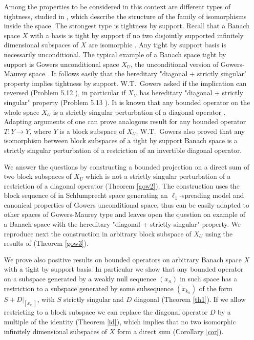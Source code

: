 \documentclass{amsart}
\numberwithin{subsection}{section}
\numberwithin{equation}{section}
\begin{document}
Among the properties to be considered in this context are different types of tightness, studied in \cite{FR1,FR2}, which describe the structure of the family of isomorphisms inside the space. The strongest type is tightness by support. Recall that a  Banach space $X$ with a basis is tight by support if no two disjointly supported infinitely dimensional subspaces of $X$ are isomorphic \cite{FR1}. Any tight by support basis is necessarily unconditional. The typical example of a Banach space tight by support is Gowers unconditional space $X_U$, the unconditional version of Gowers-Maurey space \cite{FR2,G2}. It follows easily that the hereditary "diagonal + strictly singular" property implies tightness by support. W.T.~Gowers asked if the implication can reversed (Problem 5.12 \cite{G2}), in particular if $X_U$ has hereditary "diagonal + strictly singular" property  (Problem 5.13 \cite{G2}). It is known that any bounded operator on the whole space $X_U$ is a strictly singular perturbation of a diagonal operator \cite{GM0}. Adapting arguments of \cite{ABR} one can prove analogous result for any bounded operator $T: Y\to Y$, where $Y$ is a block subspace of $X_U$. W.T.~Gowers \cite{G3} also proved that any isomorphism between block subspaces of a tight by support Banach space is a strictly singular perturbation of a restriction of an invertible diagonal operator.

We answer the questions by constructing a bounded projection on a direct sum of two block subspaces of $X_U$ which is not a strictly singular perturbation of a restriction of a diagonal operator (Theorem \ref{gow2}). The construction uses the block sequence of \cite{KL} in Schlumprecht space generating an $\ell_1$-spreading model and canonical properties of Gowers unconditional space, thus can be easily adapted to other spaces of Gowers-Maurey type and leaves open the question on example of a Banach space with the hereditary "diagonal + strictly singular" property. We reproduce next the construction in arbitrary block subspace of $X_U$ using the results of \cite{FS} (Theorem \ref{gow3}). 

We prove also positive results on bounded operators on arbitrary Banach space $X$ with a tight by support basis. In particular we show that any bounded operator on a subspace generated by a weakly null sequence $(x_n)$ in such space has a restriction to a subspace generated by some subsequence $(x_{k_n})$ of the form $S+D|_{[x_{k_n}]}$, with $S$ strictly singular and $D$ diagonal (Theorem \ref{th1}). If we allow restricting to a block subspace we can replace the diagonal operator $D$ by a multiple of the identity (Theorem \ref{id}), which implies that no two isomorphic infinitely dimensional subspaces of $X$ form a direct sum (Corollary \ref{cor}). 
\end{document}
